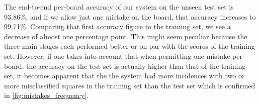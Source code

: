 \documentclass[../main.tex]{subfiles}
\begin{document}
The end-to-end per-board accuracy of our system on the unseen test set is 93.86\%, and if we allow just one mistake on the board, that accuracy increases to 99.71\%.
Comparing that first accuracy figure to the training set, we see a decrease of almost one percentage point. 
This might seem peculiar because the three main stages each performed better or on par with the scores of the training set.
However, if one takes into account that when permitting one mistake per board, the accuracy on the test set is actually higher than that of the training set, it becomes apparent that the the system had more incidences with two or more misclassified squares in the training set than the test set which is confirmed in \cref{fig:mistakes_frequency}.
\begin{figure}
\end{figure}
\end{document}
